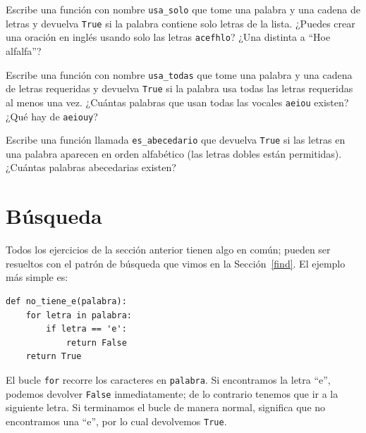 \documentclass[10pt]{book}
\begin{document}
\begin{exercise}

Escribe una función con nombre \verb"usa_solo" que tome una palabra y una
cadena de letras y devuelva {\tt True} si la palabra contiene
solo letras de la lista.  ¿Puedes crear una oración en inglés usando solo las
letras {\tt acefhlo}?  ¿Una distinta a ``Hoe alfalfa''?

\end{exercise}


\begin{exercise}

Escribe una función con nombre \verb"usa_todas" que tome una palabra y una
cadena de letras requeridas y devuelva {\tt True} si la palabra
usa todas las letras requeridas al menos una vez.  ¿Cuántas palabras
que usan todas las vocales {\tt aeiou} existen?  ¿Qué hay de {\tt aeiouy}?

\end{exercise}


\begin{exercise}

Escribe una función llamada \verb"es_abecedario" que devuelva
{\tt True} si las letras en una palabra aparecen en orden alfabético
(las letras dobles están permitidas).
¿Cuántas palabras abecedarias existen?


\end{exercise}



\section{Búsqueda}
\label{search}

Todos los ejercicios de la sección anterior tienen algo en
común; pueden ser resueltos con el patrón de búsqueda que vimos
en la Sección~\ref{find}.  El ejemplo más simple es:

\begin{verbatim}
def no_tiene_e(palabra):
    for letra in palabra:
        if letra == 'e':
            return False
    return True
\end{verbatim}
%
El bucle {\tt for} recorre los caracteres en {\tt palabra}.  Si encontramos
la letra ``e'', podemos devolver {\tt False} inmediatamente; de lo contrario
tenemos que ir a la siguiente letra.  Si terminamos el bucle de manera normal,
significa que no encontramos una ``e'', por lo cual devolvemos {\tt True}.
\end{document}
